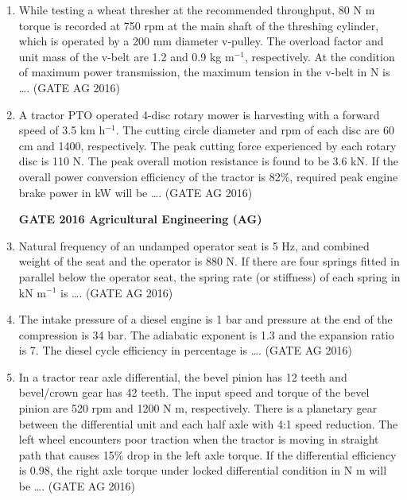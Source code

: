 \documentclass[journal]{IEEEtran}
\begin{document}
\begin{enumerate}
\medskip

\item 
While testing a wheat thresher at the recommended throughput, 80 N m torque is recorded at 750 rpm at the main shaft of the threshing cylinder, which is operated by a 200 mm diameter v-pulley. The overload factor and unit mass of the v-belt are 1.2 and 0.9 kg m$^{-1}$, respectively. At the condition of maximum power transmission, the maximum tension in the v-belt in N is \dots.
\hfill(GATE AG 2016)\\

\medskip

\item 
A tractor PTO operated 4-disc rotary mower is harvesting with a forward speed of 3.5 km h$^{-1}$. The cutting circle diameter and rpm of each disc are 60 cm and 1400, respectively. The peak cutting force experienced by each rotary disc is 110 N. The peak overall motion resistance is found to be 3.6 kN. If the overall power conversion efficiency of the tractor is 82\%, required peak engine brake power in kW will be \dots.
\hfill(GATE AG 2016)\\

\medskip

\noindent
\textbf{GATE 2016 Agricultural Engineering (AG)}

\item 
Natural frequency of an undamped operator seat is 5 Hz, and combined weight of the seat and the operator is 880 N. If there are four springs fitted in parallel below the operator seat, the spring rate (or stiffness) of each spring in kN m$^{-1}$ is \dots.
\hfill(GATE AG 2016)\\

\medskip

\item
The intake pressure of a diesel engine is 1 bar and pressure at the end of the compression is 34 bar. The adiabatic exponent is 1.3 and the expansion ratio is 7. The diesel cycle efficiency in percentage is \dots.
\hfill(GATE AG 2016)\\

\medskip

\item 
In a tractor rear axle differential, the bevel pinion has 12 teeth and bevel/crown gear has 42 teeth. The input speed and torque of the bevel pinion are 520 rpm and 1200 N m, respectively. There is a planetary gear between the differential unit and each half axle with 4:1 speed reduction. The left wheel encounters poor traction when the tractor is moving in straight path that causes 15\% drop in the left axle torque. If the differential efficiency is 0.98, the right axle torque under locked differential condition in N m will be \dots.
\hfill(GATE AG 2016)\\


\end{enumerate}
\end{document}
